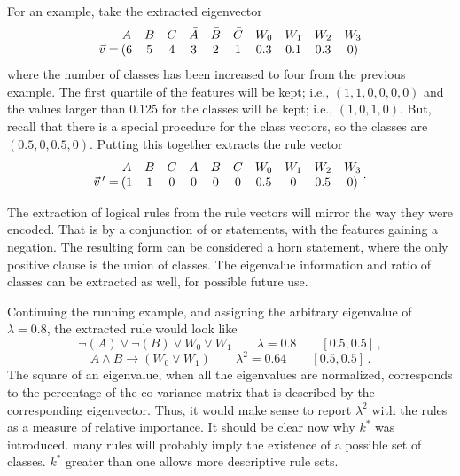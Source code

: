 \documentclass[11pt]{article}
\begin{document}
For an example, take the extracted eigenvector
\[\mqty{\, \\\vec{v} = } \:\mqty{A&B&C&\bar{A}&\bar{B}&\bar{C}&W_0&W_1&W_2&W_3\\(6&5&4&3&2&1&0.3&0.1&0.3&0)}\]
where the number of classes has been increased to four from the previous example. The first quartile of the features will be kept; i.e., $(1,1,0,0,0,0)$ and the values larger than $0.125$ for the classes will be kept; i.e., $(1, 0, 1, 0)$. But, recall that there is a special procedure for the class vectors, so the classes are $(0.5, 0, 0.5, 0)$. Putting this together extracts the rule vector 
\[\mqty{\, \\\vec{v}\, ^\prime = } \:\mqty{A&B&C&\bar{A}&\bar{B}&\bar{C}&W_0&W_1&W_2&W_3\\(1&1&0&0&0&0&0.5&0&0.5&0)} \, .\]

The extraction of logical rules from the rule vectors will mirror the way they were encoded. That is by a conjunction of or statements, with the features gaining a negation. The resulting form can be considered a horn statement, where the only positive clause is the union of classes. The eigenvalue information and ratio of classes can be extracted as well, for possible future use. 

Continuing the running example, and assigning the arbitrary eigenvalue of $\lambda =0.8$, the extracted rule would look like
\[\neg(A)\lor \neg(B) \lor W_0 \lor W_1 \qquad \lambda=0.8 \qquad [0.5, 0.5] \, ,\]
\[A \land B \rightarrow (W_0 \lor W_1) \qquad \lambda^2=0.64 \qquad [0.5, 0.5] \, .\]
The square of an eigenvalue, when all the eigenvalues are normalized, corresponds to the percentage of the co-variance matrix that is described by the corresponding eigenvector. Thus, it would make sense to report $\lambda^2$ with the rules as a measure of relative importance. It should be clear now why $k^*$ was introduced. many rules will probably imply the existence of a possible set of classes. $k^*$ greater than one allows more descriptive rule sets.
\end{document}
